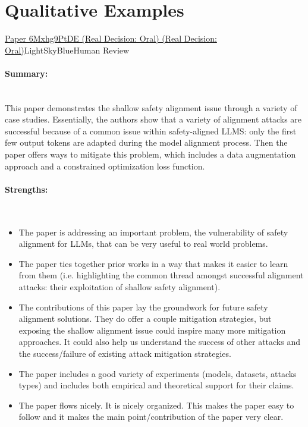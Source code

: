 \documentclass{article} %
\begin{document}
\section{Qualitative Examples}
\label{app:review_eg}


\begin{reviewbox}{\href{https://openreview.net/forum?id=6Mxhg9PtDE}{Paper 6Mxhg9PtDE (Real Decision: Oral) (Real Decision: Oral)}}{LightSkyBlue}{Human Review}
\scriptsize
\paragraph{Summary:}\leavevmode\\[0.1em]
This paper demonstrates the shallow safety alignment issue through a variety of case studies. Essentially, the authors show that a variety of alignment attacks are successful because of a common issue within safety-aligned LLMS: only the first few output tokens are adapted during the model alignment process. Then the paper offers ways to mitigate this problem, which includes a data augmentation approach and a constrained optimization loss function.


\paragraph{Strengths:}\leavevmode\\[0.1em]
\begin{itemize}
    \item The paper is addressing an important problem, the vulnerability of safety alignment for LLMs, that can be very useful to real world problems.
    \item The paper ties together prior works in a way that makes it easier to learn from them (i.e. highlighting the common thread amongst successful alignment attacks: their exploitation of shallow safety alignment).
    \item The contributions of this paper lay the groundwork for future safety alignment solutions. They do offer a couple mitigation strategies, but exposing the shallow alignment issue could inspire many more mitigation approaches. It could also help us understand the success of other attacks and the success/failure of existing attack mitigation strategies.
    \item The paper includes a good variety of experiments (models, datasets, attacks types) and includes both empirical and theoretical support for their claims.
    \item The paper flows nicely. It is nicely organized. This makes the paper easy to follow and it makes the main point/contribution of the paper very clear.
\end{itemize}


\end{reviewbox}
\end{document}
